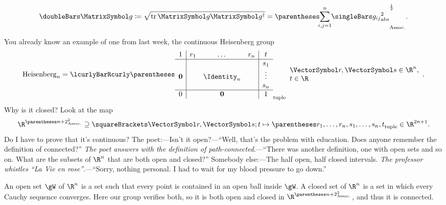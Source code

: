 \documentclass[10pt, a4paper, twoside]{lecturenotes}
\newcommand{\Rn}{{\R^n}}
\begin{document}
\begin{lecture}[date=2013-04-23]
\begin{definition}
\[\FrobeniusNorm\matg \DefineAs \sqrt{\Trace\matg\adj\matg} = \pa{\sum{i,j=1}[n]\abs{g_{ij}}^2}^{\frac{1}{2}}\text.
\]
\end{definition}
You already know an example of one from last week, the continuous Heisenberg group\[
\HeisenbergGroup[n]=\setst{\tuple{
\begin{array}{c|ccc|c}
1&r_1&\dotsc&r_n&t\\
\hline
&&&&s_1\\
\nullvec&&\Identity_n&&\vdots\\
&&&&s_n\\
\hline
0&&\nullvec&&1
\end{array}
}}{\begin{array}{l}\vr,\vs\in\Rn,\\ t\in\R\end{array}}\text.
\]
Why is it closed? Look at the map\[
\FunctionBody{\R^{\pa{n+2}^2}\Superset\Helt \vr \vs t} {\tuple{r_1,\dotsc,r_n,s_1,\dotsc,s_n,t}\in\R^{2n+1}}\text.
\]
Do I have to prove that it's continuous? 
The poet:---Isn't it open?---``Well, that's the problem with education. Does anyone remember the definition of connected?'' \emph{The poet answers with the definition of path-connected}.---``There was another definition, one with open sets and so on. What are the subsets of $\Rn$ that are both open and closed?'' Somebody else:---The half open, half closed intervals. \emph{The professor whistles ``La Vie en rose''}.---``Sorry, nothing personal. I had to wait for my blood pressure to go down.''

An open set $\gW$ of $\Rn$ is a set such that every point is contained in an open ball inside $\gW$. A closed set of  $\Rn$ is a set in which every Cauchy sequence converges. Here our group verifies both, so it is both open and closed in $\R^{\pa{n+2}^2}$, and thus it is connected.


\end{lecture}
\end{document}
